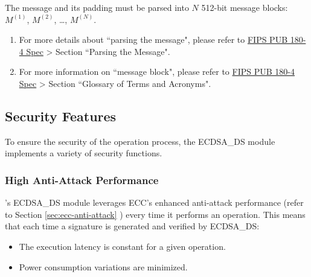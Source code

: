 \documentclass[main\_\_EN.tex]{subfiles}
\begin{document}
The message and its padding must be parsed into \begin{math}N\end{math} 512-bit message blocks: \begin{math}M^{(1)}\end{math}, \begin{math}M^{(2)}\end{math}, \dots, \begin{math}M^{(N)}\end{math}.

\begin{tiplisting}
\begin{enumerate}
\vspace{-2.5em}
    \item For more details about ``parsing the message", please refer to \href{https://doi.org/10.6028/NIST.FIPS.180-4}{FIPS PUB 180-4 Spec} > Section ``Parsing the Message".
    \item For more information on ``message block", please refer to \href{https://doi.org/10.6028/NIST.FIPS.180-4}{FIPS PUB 180-4 Spec} > Section ``Glossary of Terms and Acronyms".
\end{enumerate}
\end{tiplisting}



\subsection{Security Features}
\label{sec:ecdsa-security_features}

To ensure the security of the operation process, the ECDSA\_DS module implements a variety of security functions.

\subsubsection{High Anti-Attack Performance}

\chipseries{}'s ECDSA\_DS module leverages ECC's enhanced anti-attack performance (refer to Section \ref{sec:ecc-anti-attack} \textit{}) every time it performs an operation. This means that each time a signature is generated and verified by ECDSA\_DS:

\begin{itemize}
    \item The execution latency is constant for a given operation.
    \item Power consumption variations are minimized.
\end{itemize}
\end{document}
